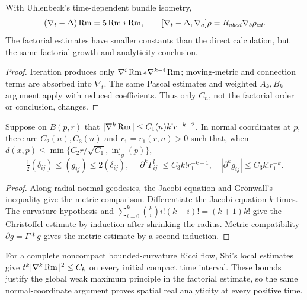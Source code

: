 \begin{example}
\label{ex:chow-ii-uhlenbeck-curvature-commutators}
With Uhlenbeck's time-dependent bundle isometry,
\[
 (\nabla_t-\Delta)\operatorname{Rm}=5\operatorname{Rm}*\operatorname{Rm},
 \qquad [\nabla_t-\Delta,\nabla_a]\rho
 =R_{abcd}\nabla_b\rho_{cd}.
\]
The factorial estimates have smaller constants than the direct calculation,
but the same factorial growth and analyticity conclusion.
\end{example}
\begin{proof}
Iteration produces only \(\nabla^i\operatorname{Rm}*\nabla^{k-i}\operatorname{Rm}\); moving-metric and
connection terms are absorbed into \(\nabla_t\).  The same Pascal estimates
and weighted \(A_k,B_k\) argument apply with reduced coefficients.  Thus only
\(C_n\), not the factorial order or conclusion, changes.
\end{proof}

\begin{lemma}
\label{lem:chow-ii-normal-coordinate-metric-derivatives}
Suppose on \(B(p,r)\) that
\(|\nabla^k\operatorname{Rm}|\leq C_1(n)k!r^{-k-2}\).  In normal coordinates at \(p\),
there are \(C_2(n),C_3(n)\) and \(r_1=r_1(r,n)>0\) such that, when
\(d(x,p)\leq\min\{C_2r/\sqrt{C_1},\operatorname{inj}_g(p)\}\),
\[
 \tfrac12(\delta_{ij})\leq(g_{ij})\leq2(\delta_{ij}),\quad
 |\partial^k\Gamma^l_{ij}|\leq C_3k!r_1^{-k-1},\quad
 |\partial^kg_{ij}|\leq C_3k!r_1^{-k}.
\]
\end{lemma}
\begin{proof}
Along radial normal geodesics, the Jacobi equation and Grönwall's inequality
give the metric comparison.  Differentiate the Jacobi equation \(k\) times.
The curvature hypothesis and
\(\sum_{i=0}^k\binom{k}{i}i!(k-i)!=(k+1)k!\) give the Christoffel estimate by
induction after shrinking the radius.  Metric compatibility
\(\partial g=\Gamma*g\) gives the metric estimate by a second induction.
\end{proof}

\begin{remark}
\label{rem:chow-ii-noncompact-analyticity}
For a complete noncompact bounded-curvature Ricci flow, Shi's local estimates
give \(t^k|\nabla^k\operatorname{Rm}|^2\leq C_k\) on every initial compact time interval.
These bounds justify the global weak maximum principle in the factorial
estimate, so the same normal-coordinate argument proves spatial real
analyticity at every positive time.
\end{remark}
